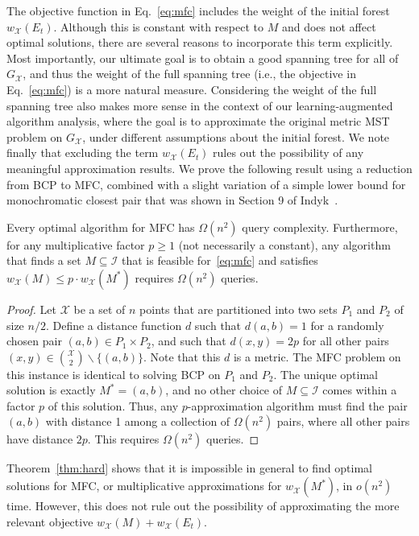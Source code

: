 The objective function in Eq.~\eqref{eq:mfc} includes the weight of the initial forest $w_\mathcal{X}(E_t)$. Although this is constant with respect to $M$ and does not affect optimal solutions, there are several reasons to incorporate this term explicitly. Most importantly, our ultimate goal is to obtain a good spanning tree for all of $G_\mathcal{X}$, and thus the weight of the full spanning tree (i.e., the objective in Eq.~\ref{eq:mfc}) is a more natural measure. Considering the weight of the full spanning tree also makes more sense in the context of our learning-augmented algorithm analysis, where the goal is to approximate the original metric MST problem on $G_\mathcal{X}$, under different assumptions about the initial forest. We note finally that excluding the term $w_\mathcal{X}(E_t)$ rules out the possibility of any meaningful approximation results. 
We prove the following result using a reduction from BCP to MFC, combined with a slight variation of a simple lower bound for monochromatic closest pair that was shown in Section 9 of Indyk~\cite{indyk1999sublinear}.
\begin{theorem}
\label{thm:hard}
Every optimal algorithm for MFC has $\Omega(n^2)$ query complexity. Furthermore, for any multiplicative factor $p \geq 1$ (not necessarily a constant), any algorithm that finds a set $M \subseteq \mathcal{I}$ that is feasible for~\eqref{eq:mfc} and satisfies $w_\mathcal{X}(M) \leq p \cdot w_{\mathcal{X}}(M^*)$ requires $\Omega(n^2)$ queries.
\end{theorem}
\begin{proof}
	Let $\mathcal{X}$ be a set of $n$ points that are partitioned into two sets $P_1$ and $P_2$ of size $n/2$. Define a distance function $d$ such that $d(a,b) = 1$ for a randomly chosen pair $(a,b) \in P_1 \times P_2$, and such that $d(x,y) = 2p$ for all other pairs $(x,y) \in {\mathcal{X} \choose 2} \backslash \{(a,b)\}$. Note that this $d$ is a metric. The MFC problem on this instance is identical to solving BCP on $P_1$ and $P_2$. The unique optimal solution is exactly $M^* = (a,b)$, and no other choice of $M \subseteq \mathcal{I}$ comes within a factor $p$ of this solution. Thus, any $p$-approximation algorithm must find the pair $(a,b)$ with distance 1 among a collection of $\Omega(n^2)$ pairs, where all other pairs have distance $2p$. This requires $\Omega(n^2)$ queries.
\end{proof}
Theorem~\ref{thm:hard} shows that it is impossible in general to find optimal solutions for MFC, or multiplicative approximations for $w_\mathcal{X}(M^*)$, in $o(n^2)$ time. However, this does not rule out the possibility of approximating the more relevant objective $w_\mathcal{X}(M) + w_\mathcal{X}(E_t)$.

